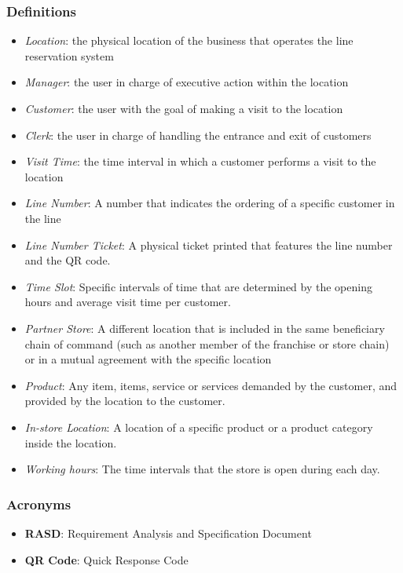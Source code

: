 \subsubsection{Definitions}
\begin{itemize}
    \item \textit{Location}: the physical location of the business that operates the line reservation system
    \item \textit{Manager}: the user in charge of executive action within the location
    \item \textit{Customer}: the user with the goal of making a visit to the location
    \item \textit{Clerk}: the user in charge of handling the entrance and exit of customers
    \item \textit{Visit Time}: the time interval in which a customer performs a visit to the location
    \item \textit{Line Number}: A number that indicates the ordering of a specific customer in the line
    \item \textit{Line Number Ticket}: A physical ticket printed that features the line number and the QR code.
    \item \textit{Time Slot}: Specific intervals of time that are determined by the opening hours and average visit time per customer.
    \item \textit{Partner Store}: A different location that is included in the same beneficiary chain of command (such as another member of the franchise or store chain) or in a mutual agreement with the specific location
    \item \textit{Product}: Any item, items, service or services demanded by the customer, and provided by the location to the customer.
    \item \textit{In-store Location}: A location of a specific product or a product category inside the location.
    \item \textit{Working hours}: The time intervals that the store is open during each day.
\end{itemize}
\subsubsection{Acronyms}
\begin{itemize}
    \item \textbf{RASD}: Requirement Analysis and Specification Document
    \item \textbf{QR Code}: Quick Response Code
\end{itemize}
